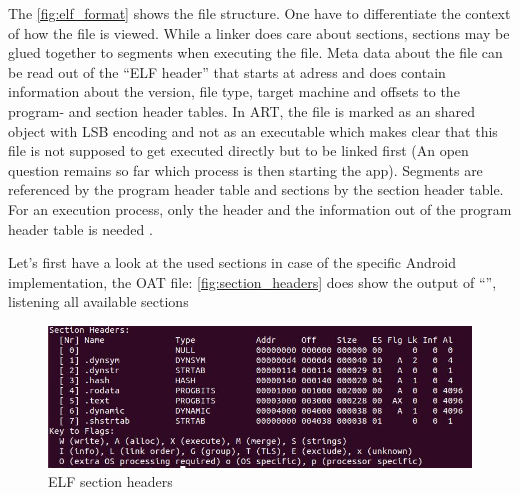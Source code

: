 The \autoref{fig:elf_format} shows the file structure.
One have to differentiate the context of how the file is viewed.
While a linker does care about sections, sections may be
glued together to segments when executing the file.
Meta data about the file can be read out of the ``ELF header''
that starts at adress  and does contain
information about the version, file type, target machine and
offsets to the program- and section header tables.
In ART, the file is marked as an shared object with LSB encoding
and not as an executable which makes clear that this file is not
supposed to get executed directly but to be linked first
(An open question remains so far which process is then starting
the app).
Segments are referenced by the program header table and sections
by the section header table. For an execution process, only the header
and the information out of the program header table is needed
\parencite{life_of_binaries}.

Let's first have a look at the used sections in case of the specific
Android implementation, the OAT file:
\autoref{fig:section_headers} does show the output of
``'', listening all available sections

\begin{figure}[htb]
  \centering
  \includegraphics[width=\textwidth]{figures/android_elf_section_headers}
  \caption[ELF section headers]{ELF section headers}
  \label{fig:section_headers}
\end{figure}

